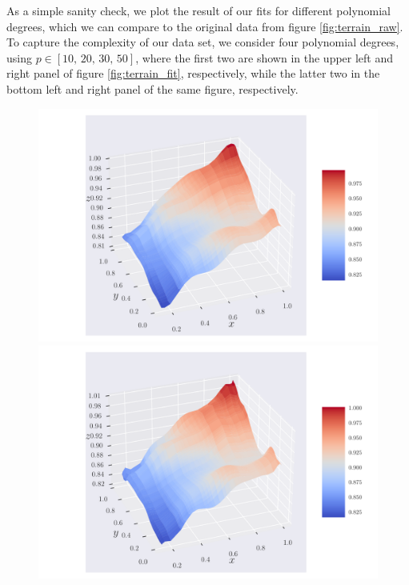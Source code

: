 \documentclass[reprint,english,notitlepage,aps,nobalancelastpage,nofootinbib]{revtex4-1}  %
\begin{document}
As a simple sanity check, we plot the result of our fits for different polynomial degrees, which we can compare to the original data from figure \ref{fig:terrain_raw}. To capture the complexity of our data set, we consider four polynomial degrees, using $p\in[10,\,20,\,30,\,50]$, where the first two are shown in the upper left and right panel of figure \ref{fig:terrain_fit}, respectively, while the latter two in the bottom left and right panel of the same figure, respectively.

\begin{figure}[H]
	\includegraphics[width=\linewidth]{SRTM_prediction_p10.pdf}
	\endminipage\hfill
	\includegraphics[width=\linewidth]{SRTM_prediction_p20.pdf}
	\endminipage\hfill

\end{figure}
\end{document}
